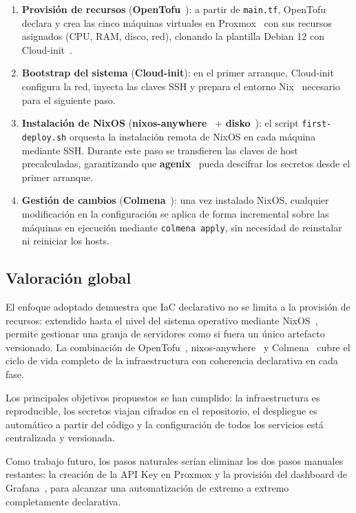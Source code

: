 \documentclass[a4paper, 11pt]{article}
\begin{document}
\begin{enumerate}
  \item \textbf{Provisión de recursos} (\textbf{OpenTofu}~\cite{opentofu}): a partir de \texttt{main.tf},
    OpenTofu declara y crea las cinco máquinas virtuales en Proxmox~\cite{proxmox} con sus
    recursos asignados (CPU, RAM, disco, red), clonando la plantilla Debian 12 con
    Cloud-init~\cite{cloudinit}.
  \item \textbf{Bootstrap del sistema} (\textbf{Cloud-init}): en el primer arranque, Cloud-init
    configura la red, inyecta las claves SSH y prepara el entorno Nix~\cite{nix} necesario
    para el siguiente paso.
  \item \textbf{Instalación de NixOS} (\textbf{nixos-anywhere}~\cite{nixos-anywhere} + \textbf{disko}~\cite{disko}):
    el script \texttt{first-deploy.sh} orquesta la instalación remota de NixOS en cada máquina
    mediante SSH. Durante este paso se transfieren las claves de host precalculadas,
    garantizando que \textbf{agenix}~\cite{agenix} pueda descifrar los secretos desde el primer arranque.
  \item \textbf{Gestión de cambios} (\textbf{Colmena}~\cite{colmena}): una vez instalado NixOS,
    cualquier modificación en la configuración se aplica de forma incremental sobre las
    máquinas en ejecución mediante \texttt{colmena apply}, sin necesidad de reinstalar ni
    reiniciar los hosts.
\end{enumerate}

\subsection{Valoración global}

El enfoque adoptado demuestra que IaC declarativo no se limita a la provisión de recursos:
extendido hasta el nivel del sistema operativo mediante NixOS~\cite{nixos}, permite gestionar
una granja de servidores como si fuera un único artefacto versionado. La combinación de
OpenTofu~\cite{opentofu}, nixos-anywhere~\cite{nixos-anywhere} y Colmena~\cite{colmena}
cubre el ciclo de vida completo de la infraestructura con coherencia declarativa en cada fase.

Los principales objetivos propuestos se han cumplido: la infraestructura es reproducible,
los secretos viajan cifrados en el repositorio, el despliegue es automático a partir del
código y la configuración de todos los servicios está centralizada y versionada.

Como trabajo futuro, los pasos naturales serían eliminar los dos pasos manuales restantes:
la creación de la API Key en Proxmox y la provisión del dashboard de Grafana~\cite{grafana},
para alcanzar una automatización de extremo a extremo completamente declarativa.

\newpage

\printbibliography
\end{document}
